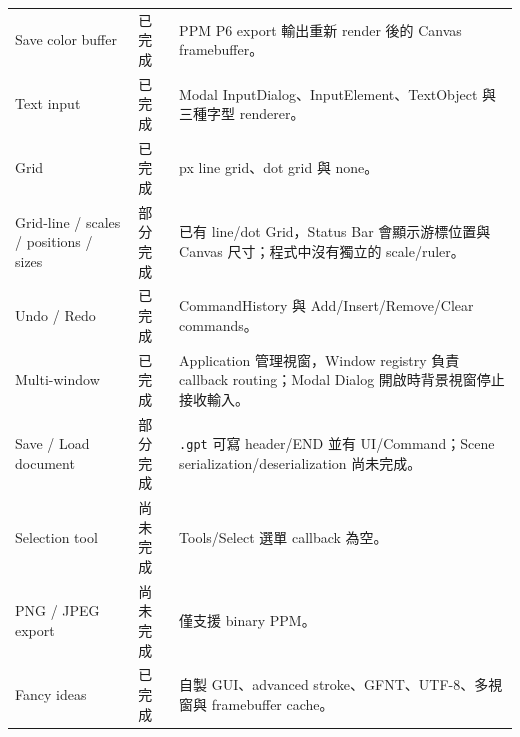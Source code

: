 \begin{longtable}{>{\raggedright\arraybackslash}p{} >{\raggedright\arraybackslash}p{} >{\raggedright\arraybackslash}p{}}
    Save color buffer                      & 已完成    & PPM P6 export 輸出重新 render 後的 Canvas framebuffer。                                       \\
    Text input                             & 已完成    & Modal InputDialog、InputElement、TextObject 與三種字型 renderer。                              \\
    Grid                                   & 已完成    & 25 px line grid、dot grid 與 none。                                                       \\
    Grid-line / scales / positions / sizes & 部分完成   & 已有 line/dot Grid，Status Bar 會顯示游標位置與 Canvas 尺寸；程式中沒有獨立的 scale/ruler。                   \\
    Undo / Redo                            & 已完成    & CommandHistory 與 Add/Insert/Remove/Clear commands。                                     \\
    Multi-window                           & 已完成    & Application 管理視窗，Window registry 負責 callback routing；Modal Dialog 開啟時背景視窗停止接收輸入。       \\
    Save / Load document                   & 部分完成   & \lstinline|.gpt| 可寫 header/END 並有 UI/Command；Scene serialization/deserialization 尚未完成。 \\
    Selection tool                         & 尚未完成   & Tools/Select 選單 callback 為空。                                                           \\
    PNG / JPEG export                      & 尚未完成   & 僅支援 binary PPM。                                                                        \\
    Fancy ideas                            & 已完成    & 自製 GUI、advanced stroke、GFNT、UTF-8、多視窗與 framebuffer cache。                              \\
    \bottomrule
\end{longtable}
